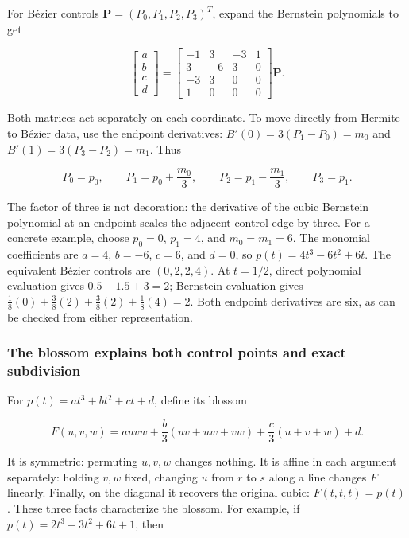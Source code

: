 For Bézier controls \(\mathbf{P}=(P_0,P_1,P_2,P_3)^T\), expand the Bernstein polynomials to get

\[
\begin{bmatrix}a\\b\\c\\d\end{bmatrix}=
\begin{bmatrix}
-1&3&-3&1\\
3&-6&3&0\\
-3&3&0&0\\
1&0&0&0
\end{bmatrix}\mathbf{P}.
\]

Both matrices act separately on each coordinate. To move directly from Hermite to Bézier data, use the endpoint derivatives: \(B'(0)=3(P_1-P_0)=m_0\) and \(B'(1)=3(P_3-P_2)=m_1\). Thus

\[
P_0=p_0,\qquad P_1=p_0+\frac{m_0}{3},\qquad
P_2=p_1-\frac{m_1}{3},\qquad P_3=p_1.
\]

The factor of three is not decoration: the derivative of the cubic Bernstein polynomial at an endpoint scales the adjacent control edge by three. For a concrete example, choose \(p_0=0\), \(p_1=4\), and \(m_0=m_1=6\). The monomial coefficients are \(a=4\), \(b=-6\), \(c=6\), and \(d=0\), so \(p(t)=4t^3-6t^2+6t\). The equivalent Bézier controls are \((0,2,2,4)\). At \(t=1/2\), direct polynomial evaluation gives \(0.5-1.5+3=2\); Bernstein evaluation gives \(\frac18(0)+\frac38(2)+\frac38(2)+\frac18(4)=2\). Both endpoint derivatives are six, as can be checked from either representation.

\subsubsection{The blossom explains both control points and exact subdivision}\label{03-visual-computing-i-ch001-the-blossom-explains-both-control-points-and-exact-subdivision}

\hypertarget{03-visual-computing-i-ch001-the-blossom-explains-both-control-points-and-exact-subdivision}{}

For \(p(t)=at^3+bt^2+ct+d\), define its blossom

\[
F(u,v,w)=a uvw+\frac b3(uv+uw+vw)+\frac c3(u+v+w)+d.
\]

It is symmetric: permuting \(u,v,w\) changes nothing. It is affine in each argument separately: holding \(v,w\) fixed, changing \(u\) from \(r\) to \(s\) along a line changes \(F\) linearly. Finally, on the diagonal it recovers the original cubic: \(F(t,t,t)=p(t)\). These three facts characterize the blossom. For example, if \(p(t)=2t^3-3t^2+6t+1\), then

